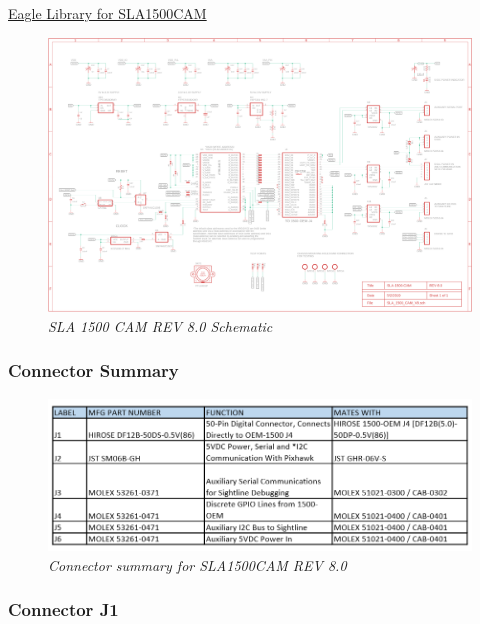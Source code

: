 \documentclass[11pt]{article}
\begin{document}
\href{https://github.com/phamtaiece/Capstone-Sightline/tree/master/EAGLE\%20files/Library}{Eagle Library for SLA1500CAM}

\begin{landscape}
   \begin{figure}[H]
	\centering	
	\includegraphics[width=9.5in]{SLA1500CAM_V8_sch}
	\caption{\textit{SLA 1500 CAM REV 8.0 Schematic}}	
	\end{figure}
\end{landscape}

\subsubsection{Connector Summary}

    \begin{figure}[H]
	\centering	
	\includegraphics[width=7 in]{SLA1500CAM_CONN_V3}
	\caption{\textit{Connector summary for SLA1500CAM REV 8.0}}	
	\end{figure}

\newpage

\subsubsection{Connector J1}
\end{document}
